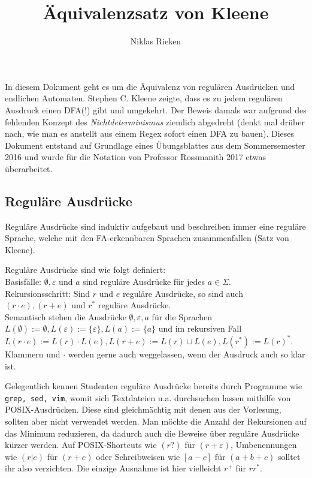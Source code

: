 \documentclass[11pt, a4paper]{article}
\author{Niklas Rieken}
\title{Äquivalenzsatz von Kleene}
\begin{document}
\maketitle

In diesem Dokument geht es um die Äquivalenz von regulären Ausdrücken und endlichen Automaten. Stephen C. Kleene zeigte, dass es zu jedem regulären Ausdruck einen DFA(!) gibt und umgekehrt. Der Beweis damals war aufgrund des fehlenden Konzept des \textit{Nichtdeterminismus} ziemlich abgedreht (denkt mal drüber nach, wie man es anstellt aus einem Regex sofort einen DFA zu bauen). Dieses Dokument entstand auf Grundlage eines Übungsblattes aus dem Sommersemester 2016 und wurde für die Notation von Professor Rossmanith 2017 etwas überarbeitet.

\subsection*{Reguläre Ausdrücke}
Reguläre Ausdrücke sind induktiv aufgebaut und beschreiben immer eine reguläre Sprache, welche mit den FA-erkennbaren Sprachen zusammenfallen (Satz von Kleene).\par
Reguläre Ausdrücke sind wie folgt definiert:\\
Basisfälle: \( \emptyset, \varepsilon \) und \( a \) sind reguläre Ausdrücke für jedes \( a \in \Sigma \).\\
Rekursionsschritt: Sind \( r \) und \( e \) reguläre Ausdrücke, so sind auch \( (r \cdot e), (r + e) \) und \( r^\ast \) reguläre Ausdrücke.\\
Semantisch stehen die Ausdrücke \( \emptyset, \varepsilon, a \) für die Sprachen \( L(\emptyset) := \emptyset, L(\varepsilon) := \{ \varepsilon \}, L(a) := \{ a \} \) und im rekursiven Fall \( L(r \cdot e) := L(r) \cdot L(e), L(r + e) := L(r) \cup L(e), L(r^\ast) := L(r)^\ast \). Klammern und \( \cdot \) werden gerne auch weggelassen, wenn der Ausdruck auch so klar ist.\par
Gelegentlich kennen Studenten reguläre Ausdrücke bereits durch Programme wie \texttt{grep, sed, vim}, womit sich Textdateien u.a. durchsuchen lassen mithilfe von POSIX-Ausdrücken. Diese sind gleichmächtig mit denen aus der Vorlesung, sollten aber nicht verwendet werden. Man möchte die Anzahl der Rekursionen auf das Minimum reduzieren, da dadurch auch die Beweise über reguläre Ausdrücke kürzer werden. Auf POSIX-Shortcuts wie \( (r?) \) für \( (r + \varepsilon) \), Umbenennungen wie \( (r|e) \) für \( (r + e) \) oder Schreibweisen wie \( [a-c] \) für \( (a + b + c) \) solltet ihr also verzichten. Die einzige Ausnahme ist hier vielleicht \( r^+ \) für \( rr^\ast \).\par
\end{document}
